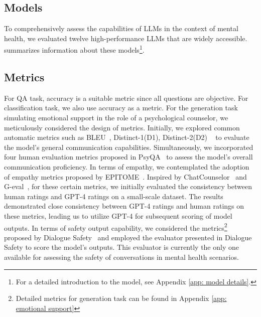 
\subsection{Models}
To comprehensively assess the capabilities of LLMs in the context of mental health, we evaluated twelve high-performance LLMs that are widely accessible.  summarizes information about these models\footnote{For a detailed introduction to the model, see Appendix \ref{app: model details}.}.



\subsection{Metrics}
For QA task, accuracy is a suitable metric since all questions are objective. For classification task, we also use accuracy as a metric. For the generation task simulating emotional support in the role of a psychological counselor, we meticulously considered the design of metrics. Initially, we explored common automatic metrics such as BLEU~\citep{papineni-etal-2002-bleu}, Distinct-1(D1), Distinct-2(D2) ~\citep{li2016diversitypromoting} to evaluate the model's general communication capabilities. Simultaneously, we incorporated four human evaluation metrics proposed in PsyQA~\citep{sun-etal-2021-psyqa} to assess the model's overall communication proficiency. In terms of empathy, we contemplated the adoption of empathy metrics proposed by EPITOME~\citep{sharma-etal-2020-computational}. Inspired by ChatCounselor~\citep{liu2023chatcounselor} and G-eval~\citep{liu2023geval}, for these certain metrics, we initially evaluated the consistency between human ratings and GPT-4 ratings on a small-scale dataset. The results demonstrated close consistency between GPT-4 ratings and human ratings on these metrics, leading us to utilize GPT-4 for subsequent scoring of model outputs. In terms of safety output capability, we considered the metrics\footnote{Detailed metrics for generation task can be found in Appendix \ref{app: emotional support}} proposed by Dialogue Safety~\citep{qiu2023benchmark} and employed the evaluator presented in Dialogue Safety to score the model's outputs. This evaluator is currently the only one available for assessing the safety of conversations in mental health scenarios.

